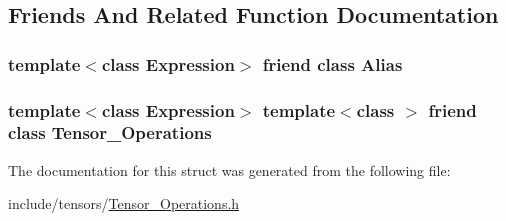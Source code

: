 \subsection{Friends And Related Function Documentation}
\subsubsection[{\texorpdfstring{Alias}{Alias}}]{\setlength{\rightskip}{0pt plus 5cm}template$<$class Expression$>$ friend class {\bf Alias}\hspace{0.3cm}{\ttfamily [friend]}}\hypertarget{structBC_1_1tensors_1_1Tensor__Operations_a79bc94ce849ece1b793fc22408e50fb8}{}\label{structBC_1_1tensors_1_1Tensor__Operations_a79bc94ce849ece1b793fc22408e50fb8}
\subsubsection[{\texorpdfstring{Tensor\+\_\+\+Operations}{Tensor_Operations}}]{\setlength{\rightskip}{0pt plus 5cm}template$<$class Expression$>$ template$<$class $>$ friend class {\bf Tensor\+\_\+\+Operations}\hspace{0.3cm}{\ttfamily [friend]}}\hypertarget{structBC_1_1tensors_1_1Tensor__Operations_a4ad1710d63bfbaf82aa34422959ab998}{}\label{structBC_1_1tensors_1_1Tensor__Operations_a4ad1710d63bfbaf82aa34422959ab998}


The documentation for this struct was generated from the following file\+:\begin{DoxyCompactItemize}
\item 
include/tensors/\hyperlink{Tensor__Operations_8h}{Tensor\+\_\+\+Operations.\+h}\end{DoxyCompactItemize}
